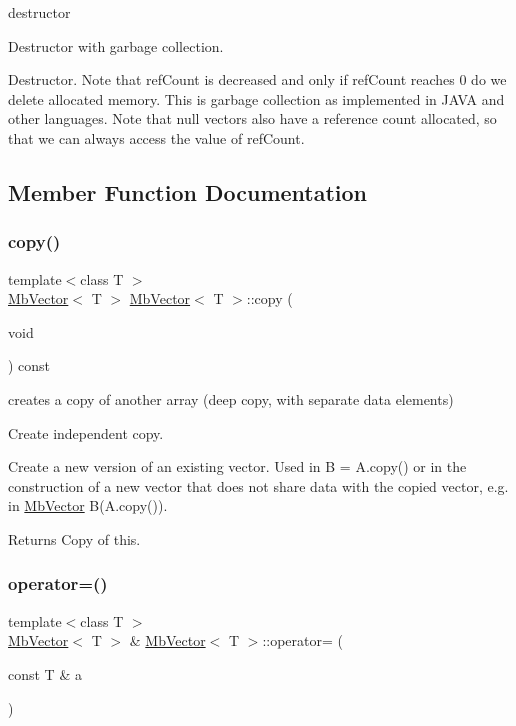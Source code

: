 destructor 

Destructor with garbage collection.

Destructor. Note that ref\+Count is decreased and only if ref\+Count reaches 0 do we delete allocated memory. This is garbage collection as implemented in J\+A\+VA and other languages. Note that null vectors also have a reference count allocated, so that we can always access the value of ref\+Count. 

\subsection{Member Function Documentation}
\mbox{\label{class_mb_vector_afa32c2ecf3505826f287b20a3ef60cc1}} 
\subsubsection{\texorpdfstring{copy()}{copy()}}
{\footnotesize\ttfamily template$<$class T $>$ \\
\mbox{\hyperlink{class_mb_vector}{Mb\+Vector}}$<$ T $>$ \mbox{\hyperlink{class_mb_vector}{Mb\+Vector}}$<$ T $>$\+::copy (\begin{DoxyParamCaption}\item[{void}]{ }\end{DoxyParamCaption}) const}



creates a copy of another array (deep copy, with separate data elements) 

Create independent copy.

Create a new version of an existing vector. Used in B = A.\+copy() or in the construction of a new vector that does not share data with the copied vector, e.\+g. in \mbox{\hyperlink{class_mb_vector}{Mb\+Vector}} B(A.\+copy()).

\begin{DoxyReturn}{Returns}
Copy of this. 
\end{DoxyReturn}
\mbox{\label{class_mb_vector_a1ffe936bb9037ce910da8a095782a929}} 
\subsubsection{\texorpdfstring{operator=()}{operator=()}}
{\footnotesize\ttfamily template$<$class T $>$ \\
\mbox{\hyperlink{class_mb_vector}{Mb\+Vector}}$<$ T $>$ \& \mbox{\hyperlink{class_mb_vector}{Mb\+Vector}}$<$ T $>$\+::operator= (\begin{DoxyParamCaption}\item[{const T \&}]{a }\end{DoxyParamCaption})\hspace{0.3cm}{\ttfamily [inline]}}



